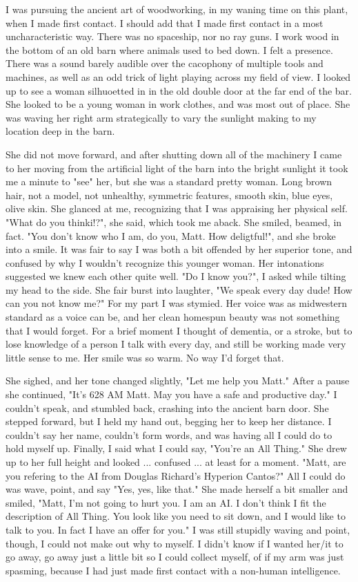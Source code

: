 I was pursuing the ancient art of woodworking, in my waning time on this
plant, when I made first contact. 
I should add that I made first contact in a most uncharacteristic way. 
There was no spaceship, nor no ray guns. 
I work wood in the bottom of an old barn where animals used to bed down.
I felt a presence.  
There was a sound barely audible over the cacophony of multiple tools
and machines, as well as an
odd trick of light playing across my field of view. 
I looked up to see a woman silhuoetted in in the old double door at the
far end of the bar.  
She looked to be a young woman in work clothes, and was most out of
place. 
She was waving her right arm strategically to vary the sunlight making
to my location deep in the barn. 

She did not move forward, and after shutting down all of the machinery I
came to her moving from the artificial light of the barn into the bright
sunlight it took me a minute to "see" her, but she was a standard pretty
woman.  Long brown hair, not a model, not unhealthy, symmetric features,
smooth skin, blue eyes, olive skin. 
She glanced at me, recognizing that I was appraising her physical self.
"What do you thinki!?", she said, which took me aback. 
She smiled, beamed, in fact. 
"You don't know who I am, do you, Matt.  How deligtful!", and she broke
into a smile. 
It was fair to say I was both a bit offended by her superior tone, and
confused by why I wouldn't recognize this younger woman. 
Her intonations suggested we knew each other quite well. 
"Do I know you?", I asked while tilting my head to the side. 
She fair burst into laughter, "We speak every day dude! How can you not
know me?"  
For my part I was stymied.   
Her voice was as midwestern standard as a voice can be, and her clean
homespun beauty was not something that I would forget.   
For a brief moment I thought of dementia, or a stroke, but to lose
knowledge of a person I talk with every day, and still be working made
very little sense to me. 
Her smile was so warm.  No way I'd forget that. 


She sighed, and her tone changed slightly, "Let me help you Matt."
After a pause she continued, "It's
628 AM Matt.  May you have a safe and productive day."
I couldn't speak, and stumbled back, crashing into the ancient barn
door.  She stepped forward, but I held my hand out, begging her to keep
her distance. 
I couldn't say her name, couldn't form words, and was having all I could
do to hold myself up. 
Finally, I said what I could say, "You're an All Thing." 
She drew up to her full height and looked ... confused ... at least for
a moment. 
"Matt, are you refering to the AI from Douglas Richard's Hyperion
Cantos?"
All I could do was wave, point, and say "Yes, yes, like that."
She made herself a bit smaller and smiled, "Matt, I'm not going to hurt
you.  I am an AI.  I don't think I fit the description of All Thing. You
look like you need to sit down, and I would like to talk to you.  In
fact I have an offer for you."
I was still stupidly waving and point, though, I could not make out why
to myself.  I didn't know if I wanted her/it to go away, go away just a
little bit so I could collect myself, of if my arm was just spasming,
because I had just made first contact with a non-human intelligence.

